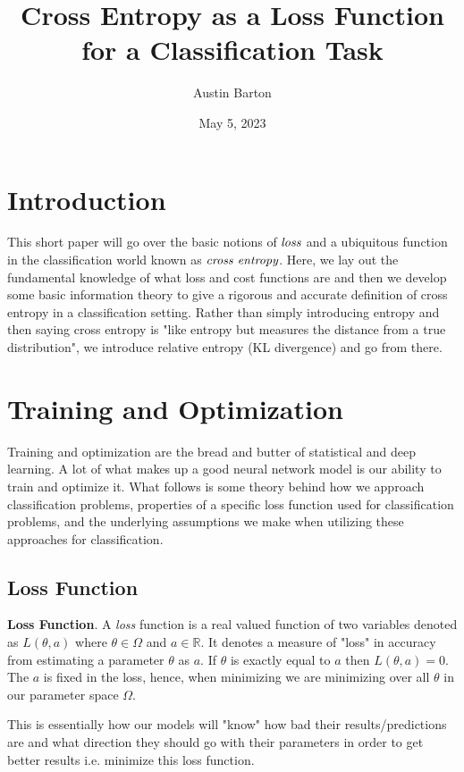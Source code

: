 \documentclass[12pt]{article}
\title{\vspace{-40pt}\hspace{28pt}\textbf{Cross Entropy as a Loss Function for a Classification Task}}
\author[1]{Austin Barton}
\date{May 5, 2023}
\theoremstyle{definition}
\numberwithin{equation}{section}
\newcommand{\R}{\ensuremath{\mathbb{R}}}
\begin{document}
\maketitle

\thispagestyle{empty}
\section*{Introduction}
This short paper will go over the basic notions of $\emph{loss}$ and a ubiquitous function in the classification world known as $\emph{cross entropy}$. Here, we lay out the fundamental knowledge of what loss and cost functions are and then we develop some basic information theory to give a rigorous and accurate definition of cross entropy in a classification setting. Rather than simply introducing entropy and then saying cross entropy is "like entropy but measures the distance from a true distribution", we introduce relative entropy (KL divergence) and go from there.

\section{Training and Optimization}

Training and optimization are the bread and butter of statistical and deep learning. A lot of what makes up a good neural network model is our ability to train and optimize it. What follows is some theory behind how we approach classification problems, properties of a specific loss function used for classification problems, and the underlying assumptions we make when utilizing these approaches for classification.

\subsection{Loss Function}
 \textbf{Loss Function}. A \emph{loss} function is a real valued function of two variables denoted as $L(\theta, a)$ where $\theta \in \Omega$ and $a\in \R$. It denotes a measure of "loss" in accuracy from estimating a parameter $\theta$ as $a$. If $\theta$ is exactly equal to $a$ then $L(\theta, a) = 0$. The $a$ is fixed in the loss, hence, when minimizing we are minimizing over all $\theta$ in our parameter space $\Omega$. 

This is essentially how our models will "know" how bad their results/predictions are and what direction they should go with their parameters in order to get better results i.e. minimize this loss function. %
\end{document}
